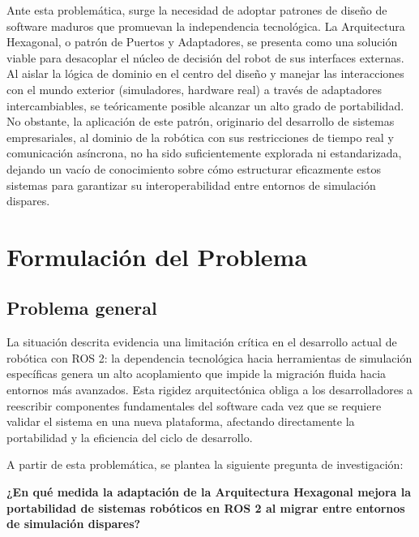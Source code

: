 Ante esta problemática, surge la necesidad de adoptar patrones de diseño de software maduros que promuevan la independencia tecnológica. La Arquitectura Hexagonal, o patrón de Puertos y Adaptadores, se presenta como una solución viable para desacoplar el núcleo de decisión del robot de sus interfaces externas. Al aislar la lógica de dominio en el centro del diseño y manejar las interacciones con el mundo exterior (simuladores, hardware real) a través de adaptadores intercambiables, se teóricamente posible alcanzar un alto grado de portabilidad. No obstante, la aplicación de este patrón, originario del desarrollo de sistemas empresariales, al dominio de la robótica con sus restricciones de tiempo real y comunicación asíncrona, no ha sido suficientemente explorada ni estandarizada, dejando un vacío de conocimiento sobre cómo estructurar eficazmente estos sistemas para garantizar su interoperabilidad entre entornos de simulación dispares. 







\section{Formulación del Problema}

\subsection{Problema general}

La situación descrita evidencia una limitación crítica en el desarrollo actual de robótica con ROS 2: la dependencia tecnológica hacia herramientas de simulación específicas genera un alto acoplamiento que impide la migración fluida hacia entornos más avanzados. Esta rigidez arquitectónica obliga a los desarrolladores a reescribir componentes fundamentales del software cada vez que se requiere validar el sistema en una nueva plataforma, afectando directamente la portabilidad y la eficiencia del ciclo de desarrollo.

A partir de esta problemática, se plantea la siguiente pregunta de investigación:

\medskip

\noindent\textbf{¿En qué medida la adaptación de la Arquitectura Hexagonal mejora la portabilidad de sistemas robóticos en ROS 2 al migrar entre entornos de simulación dispares?}



